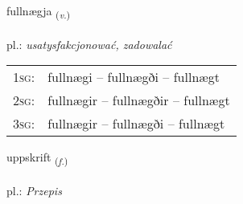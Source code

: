 \documentclass[frontgrid, backgrid]{flacards}\usepackage[]{graphicx}\usepackage[]{xcolor}
\begin{document}
\renewcommand{\flhead}{\vskip5pt \fboxsep=0pt {\small\bfseries\footnotesize Sagnorð | czasownik}}
\renewcommand{\fcfoot}{\vskip5pt \fboxsep=0pt \hspace{2pt}{\small\bfseries\footnotesize 3K}}

\renewcommand{\blhead}{\vskip5pt {\small\bfseries\footnotesize Sagnorð | czasownik }}
\renewcommand{\bcfoot}{\vskip5pt \hspace{2pt}{\small\bfseries\footnotesize 3K}}


{fullnægja \small{\textsubscript{(\textit{v.})}} \\[1ex] %
\textphonetic{[fʏtlnaija]} \\
pl.: \emph{usatysfakcjonować, zadowalać} \\  [2ex]
\renewcommand*{\arraystretch}{0.8}
\begin{tabular}{p{1cm}l}
\textsc{1sg}: & fullnægi -- fullnægði -- fullnægt \\ 
\textsc{2sg}: & fullnægir -- fullnægðir -- fullnægt \\ 
\textsc{3sg}: & fullnægir -- fullnægði -- fullnægt \\ 
\end{tabular}
}

\renewcommand{\flhead}{\vskip5pt \fboxsep=0pt {\small\bfseries\footnotesize Nafnorð | rzeczownik}}
\renewcommand{\fcfoot}{\vskip5pt \fboxsep=0pt \hspace{2pt}{\small\bfseries\footnotesize 3K}}

\renewcommand{\blhead}{\vskip5pt {\small\bfseries\footnotesize Nafnorð | rzeczownik }}
\renewcommand{\bcfoot}{\vskip5pt \hspace{2pt}{\small\bfseries\footnotesize 3K}}


{uppskrift \small{\textsubscript{(\textit{f.})}} \\[1ex] %
\textphonetic{[ʏhpskrɪft]} \\
pl.: \emph{Przepis} \\  [2ex]
\renewcommand*{\arraystretch}{0.8}
}
\end{document}

